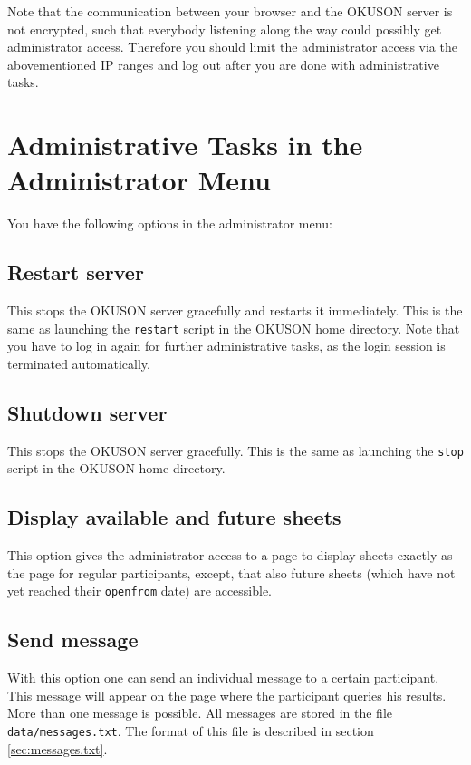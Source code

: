\documentclass[12pt,openany,a4paper]{book}
\newcommand{\OKUSON}{\textsf{OKUSON}}
\begin{document}
Note that the communication between your browser and the {\OKUSON} server is
not encrypted, such that everybody listening along the way could possibly
get administrator access. Therefore you should limit the administrator
access via the abovementioned IP ranges and log out after you are done
with administrative tasks.

\section{Administrative Tasks in the Administrator Menu}

You have the following options in the administrator menu:

\subsection{Restart server} 

This stops the {\OKUSON} server gracefully
and restarts it immediately. This is the same as launching the \texttt{restart}
script in the {\OKUSON} home directory. Note that you have to log in again
for further administrative tasks, as the login session is terminated 
automatically.

\subsection{Shutdown server} 

This stops the {\OKUSON} server gracefully.
This is the same as launching the \texttt{stop} script in the {\OKUSON}
home directory.

\subsection{Display available and future sheets} 

This option gives the administrator access to a page to display sheets
exactly as the page for regular participants, except, that also future
sheets (which have not yet reached their \texttt{openfrom} date) are
accessible.

\subsection{Send message} 
\label{sendmess}

With this option one can send an individual message to a certain
participant. This message will appear on the page where the participant
queries his results. More than one message is possible. All messages
are stored in the file \texttt{data/messages.txt}. The format of this
file is described in section \ref{sec:messages.txt}.
\end{document}
